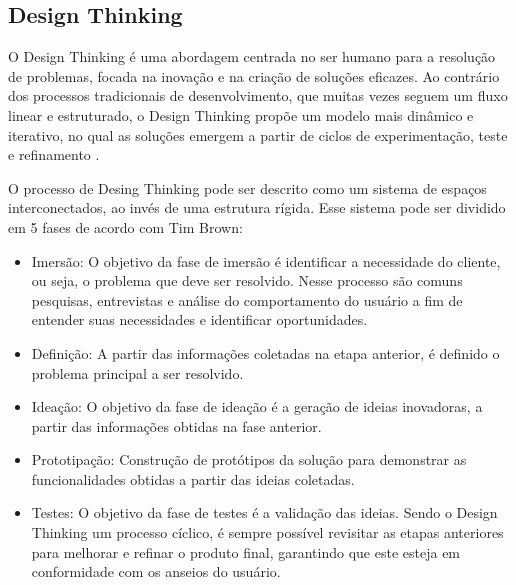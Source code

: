 \subsection{Design Thinking}
O Design Thinking é uma abordagem centrada no ser humano para a resolução de problemas, focada na inovação e na criação de soluções eficazes. Ao contrário dos processos tradicionais de desenvolvimento, que muitas vezes seguem um fluxo linear e estruturado, o Design Thinking propõe um modelo mais dinâmico e iterativo, no qual as soluções emergem a partir de ciclos de experimentação, teste e refinamento \cite{browndesignthinking}.

O processo de Desing Thinking pode ser descrito como um sistema de espaços interconectados, ao invés de uma estrutura rígida. Esse sistema pode ser dividido em 5 fases de acordo com Tim Brown:

\begin{itemize}
    \item Imersão: O objetivo da fase de imersão é identificar a necessidade do cliente, ou seja, o problema que deve ser resolvido. Nesse processo são comuns pesquisas, entrevistas e análise do comportamento do usuário a fim de entender suas necessidades e identificar oportunidades.
    \item Definição: A partir das informações coletadas na etapa anterior, é definido o problema principal a ser resolvido.
    \item Ideação: O objetivo da fase de ideação é a geração de ideias inovadoras, a partir das informações obtidas na fase anterior. 
    \item Prototipação: Construção de protótipos da solução para demonstrar as funcionalidades obtidas a partir das ideias coletadas.
    \item Testes: O objetivo da fase de testes é a validação das ideias. Sendo o Design Thinking um processo cíclico, é sempre possível revisitar as etapas anteriores para melhorar e refinar o produto final, garantindo que este esteja em conformidade com os anseios do usuário.
\end{itemize}


 